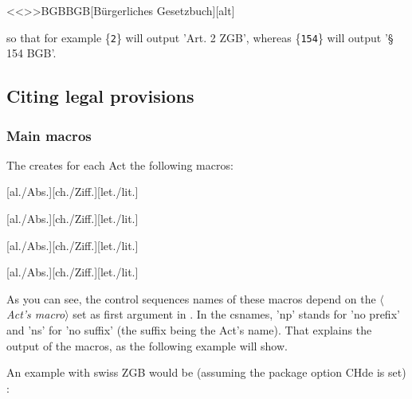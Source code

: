 \documentclass[a4paper]{ltxdockit}[2011/03/25]
\newcommand{\marg}[1]{\{\texttt{#1}\}}
\newcommand{\variable}[1]{$\langle$\textsl{#1}$\rangle$}
\begin{document}
\begin{ltxcode}
<<\DeclareLex>>{BGB}{BGB}[B\"urgerliches Gesetzbuch][alt]
\end{ltxcode}

so that for example \marg{2} will output 'Art. 2 ZGB', whereas \marg{154} will output '\S{} 154 BGB'.

\subsection{Citing legal provisions}

\subsubsection{Main macros}\label{citationmainmacros}

The  creates for each Act the following macros:

\begin{ltxsyntax}
[al./Abs.][ch./Ziff.][let./lit.]
\end{ltxsyntax} 



\begin{ltxsyntax}
[al./Abs.][ch./Ziff.][let./lit.]
\end{ltxsyntax} 

\begin{ltxsyntax}
[al./Abs.][ch./Ziff.][let./lit.]
\end{ltxsyntax} 

\begin{ltxsyntax}
[al./Abs.][ch./Ziff.][let./lit.]
\end{ltxsyntax} 


As you can see, the control sequences names of these macros depend on the \variable{Act's macro} set as first argument in . In the csnames, 'np' stands for 'no prefix' and 'ns' for 'no suffix' (the suffix being the Act's name). That explains the output of the macros, as the following example will show.

 


An example with swiss ZGB would be (assuming the package option CHde is set) :
\end{document}

